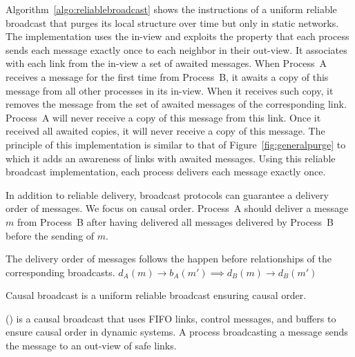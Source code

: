 Algorithm~\ref{algo:reliablebroadcast} shows the instructions of a uniform
reliable broadcast that purges its local structure over time but only in static
networks. The implementation uses the in-view and exploits the property that
each process sends each message exactly once to each neighbor in their
out-view. It associates with each link from the in-view a set of awaited
messages. When Process~A receives a message for the first time from Process~B,
it awaits a copy of this message from all other processes in its in-view. When
it receives such copy, it removes the message from the set of awaited messages
of the corresponding link. Process~A will never receive a copy of this message
from this link. Once it received all awaited copies, it will never receive a
copy of this message. The principle of this implementation is similar to that of
Figure~\ref{fig:generalpurge} to which it adds an awareness of links with
awaited messages. Using this reliable broadcast implementation, each process
delivers each message exactly once.



In addition to reliable delivery, broadcast protocols can guarantee a delivery
order of messages. We focus on causal order. Process~A should deliver a message
$m$ from Process~B after having delivered all messages delivered by Process~B
before the sending of $m$.

\begin{definition}
  The delivery order of messages follows the happen before relationships of the
  corresponding broadcasts.
  $d_A(m) \rightarrow b_A(m') \implies d_B(m) \rightarrow d_B(m')$
\end{definition}

\begin{definition}
  Causal broadcast is a uniform reliable broadcast ensuring causal order.
\end{definition}

\PCBROADCAST (\REF) is a causal broadcast that uses  FIFO
links, control messages, and buffers to ensure causal order in dynamic
systems. A process broadcasting a message sends the message to an out-view of
safe links.


